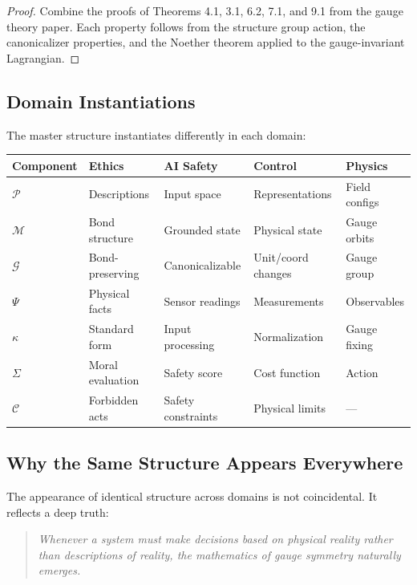 \documentclass[12pt]{article}
\begin{document}
\begin{proof}
Combine the proofs of Theorems 4.1, 3.1, 6.2, 7.1, and 9.1 from the gauge theory paper. Each property follows from the structure group action, the canonicalizer properties, and the Noether theorem applied to the gauge-invariant Lagrangian.
\end{proof}

\subsection{Domain Instantiations}

The master structure instantiates differently in each domain:

\begin{table}[h]
\centering
\begin{tabular}{lllll}
\toprule
\textbf{Component} & \textbf{Ethics} & \textbf{AI Safety} & \textbf{Control} & \textbf{Physics} \\
\midrule
$\mathcal{P}$ & Descriptions & Input space & Representations & Field configs \\
$\mathcal{M}$ & Bond structure & Grounded state & Physical state & Gauge orbits \\
$\mathcal{G}$ & Bond-preserving & Canonicalizable & Unit/coord changes & Gauge group \\
$\Psi$ & Physical facts & Sensor readings & Measurements & Observables \\
$\kappa$ & Standard form & Input processing & Normalization & Gauge fixing \\
$\Sigma$ & Moral evaluation & Safety score & Cost function & Action \\
$\mathcal{C}$ & Forbidden acts & Safety constraints & Physical limits & --- \\
\bottomrule
\end{tabular}
\end{table}

\subsection{Why the Same Structure Appears Everywhere}

The appearance of identical structure across domains is not coincidental. It reflects a deep truth:

\begin{quote}
\textit{Whenever a system must make decisions based on physical reality rather than descriptions of reality, the mathematics of gauge symmetry naturally emerges.}
\end{quote}
\end{document}
